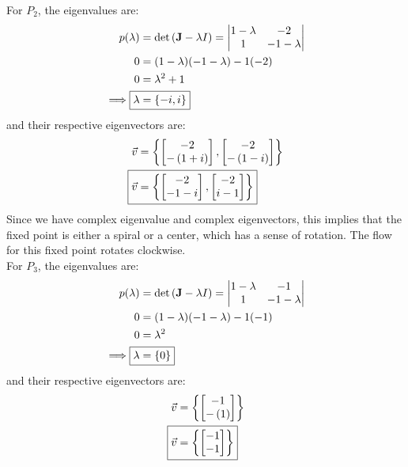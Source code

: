 For $P_2$, the eigenvalues are:
\begin{align*}
    p(\lambda) &= \det\left(\textbf{J}-\lambda I\right) = \begin{vmatrix}
        1-\lambda & -2\\
        1 & -1-\lambda
    \end{vmatrix}\\
    0 &= (1-\lambda)(-1-\lambda)-1(-2)\\
    0 &= \lambda^2+1\\
    \implies \Aboxed{\lambda &= \left\{-i, i\right\}}
\end{align*}
and their respective eigenvectors are:
\begin{align*}
    \vec{v} &= \left\{\begin{bmatrix}
        -2\\
        -\left(1+i\right)
    \end{bmatrix}, \begin{bmatrix}
        -2\\
        -\left(1-i\right)
    \end{bmatrix}\right\}\\
    \Aboxed{\vec{v} &= \left\{\begin{bmatrix}
        -2\\
        -1-i
    \end{bmatrix}, \begin{bmatrix}
        -2\\
        i-1
    \end{bmatrix}\right\}}
\end{align*}
Since we have complex eigenvalue and complex eigenvectors, this implies that the fixed point is either a spiral or a center, which has a sense of rotation. The flow for this fixed point rotates clockwise.\\
For $P_3$, the eigenvalues are:
\begin{align*}
    p(\lambda) &= \det\left(\textbf{J}-\lambda I\right) = \begin{vmatrix}
        1-\lambda & -1\\
        1 & -1-\lambda
    \end{vmatrix}\\
    0 &= (1-\lambda)(-1-\lambda)-1(-1)\\
    0 &= \lambda^2\\
    \implies \Aboxed{\lambda &= \left\{0\right\}}
\end{align*}
and their respective eigenvectors are:
\begin{align*}
    \vec{v} &= \left\{\begin{bmatrix}
        -1\\
        -\left(1\right)
    \end{bmatrix}\right\}\\
    \Aboxed{\vec{v} &= \left\{\begin{bmatrix}
        -1\\
        -1
    \end{bmatrix}\right\}}
\end{align*}
